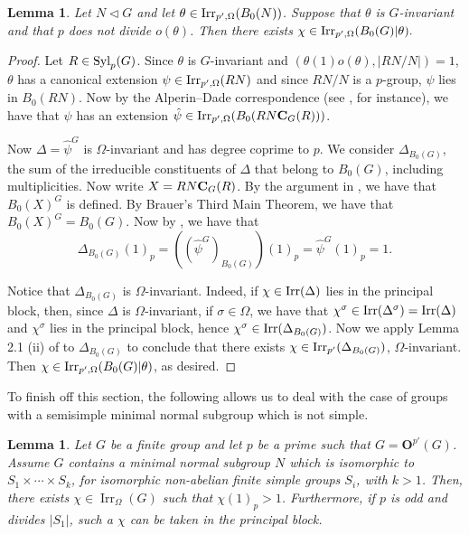 \documentclass[12pt]{amsart}
\theoremstyle{theorem}
\newtheorem{lem}[teo]{Lemma}
\theoremstyle{definition}
\def\cent#1#2{{\bf C}_{#1}(#2)}
\def\cent#1#2{{\bf C}_{#1}(#2)}
\newcommand{\bO}{{\mathbf O}}
\newcommand{\Irr}{{\operatorname{Irr}}}
\begin{document}
	\begin{lem} \label{liftingTheta}
		Let $N\lhd G$ and let $\theta\in{\rm Irr}_{p',\Omega}(B_0(N))$. Suppose that $\theta$ is $G$-invariant and that $p$ does not divide $o(\theta)$. Then there exists $\chi\in{\rm Irr}_{p',\Omega}(B_0(G)|\theta).$
	\end{lem}
	\begin{proof}
		Let $R\in{\rm Syl}_p(G)$. Since $\theta$ is $G$-invariant and $(\theta(1)o(\theta),|RN/N|)=1$, $\theta$ has a canonical extension $\psi\in{\rm Irr}_{p',\Omega}(RN)$ and since $RN/N$ is a $p$-group, $\psi$ lies in $B_0(RN)$. Now by the Alperin--Dade correspondence (see \cite[Lemma 3.1]{MMRSF}, for instance), we have that $\psi$ has an extension $\hat\psi\in{\rm Irr}_{p',\Omega}(B_0(RN\cent G R))$.
		
		Now $\Delta=\hat\psi^G$ is $\Omega$-invariant and has degree coprime to $p$. We consider $\Delta_{B_0(G)}$, the sum of the irreducible constituents of $\Delta$ that belong to $B_0(G)$, including multiplicities. Now write $X=RN\cent G R$. By the argument in \cite[page 213]{NavarroBlocks}, we have that $B_0(X)^G$ is defined. By Brauer's Third Main Theorem, we have that $B_0(X)^G=B_0(G)$. Now by \cite[Corollary 6.4]{NavarroBlocks}, we have that
		$$\Delta_{B_0(G)}(1)_p=((\hat{\psi}^G)_{B_0(G)})(1)_p=\hat{\psi}^G(1)_p=1.$$
		
		Notice that $\Delta_{B_0(G)}$ is $\Omega$-invariant. Indeed, if $\chi\in{\rm Irr}(\Delta)$ lies in the principal block, then, since $\Delta$ is $\Omega$-invariant, if $\sigma\in \Omega$, we have that $\chi^\sigma\in{\rm Irr}(\Delta^\sigma)={\rm Irr}(\Delta)$ and $\chi^\sigma$ lies in the principal block, hence $\chi^\sigma\in{\rm Irr}(\Delta_{B_0(G)})$. Now we apply Lemma 2.1 (ii) of \cite{NT} to $\Delta_{B_0(G)}$ to conclude that there exists $\chi\in{\rm Irr}_{p'}(\Delta_{B_0(G)})$, $\Omega$-invariant. Then $\chi\in{\rm Irr}_{p',\Omega}(B_0(G)|\theta)$, as desired.
	\end{proof}
	
	To finish off this section, the following allows us to deal with the case of groups with a semisimple minimal normal subgroup which is not simple.
	
	\begin{lem}
		\label{SemisimpleCase}
		Let $G$ be a finite group and let $p$ be a prime such that $G = \bO^{p'}(G)$. Assume $G$ contains a minimal normal subgroup $N$ which is isomorphic to $S_1 \times \cdots \times S_k$, for isomorphic non-abelian finite simple groups $S_i$, with $k > 1$. Then, there exists $\chi \in \Irr_{\Omega}(G)$ such that $\chi(1)_p > 1$. Furthermore, if $p$ is odd and divides $|S_1|$, such a $\chi$ can be taken in the principal block.
	\end{lem}
	
\end{document}
